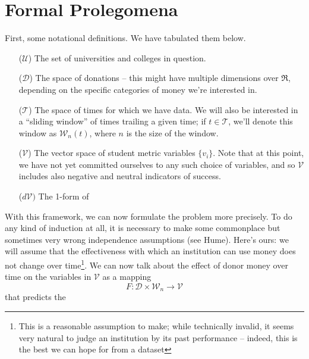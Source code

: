 \documentclass[paper.tex]{subfiles}
\newcommand{\U}{\mathcal{U}}
\newcommand{\D}{\mathcal{D}}
\newcommand{\V}{\mathcal{V}}
\newcommand{\T}{\mathcal{T}}
\newcommand{\W}{\mathcal{W}}
\begin{document}
	
	\section{Formal Prolegomena}
	
	First, some notational definitions. We have tabulated them below. 
	
	\begin{itemize}
		\item[($\U$)] The set of universities and colleges in question.
		\item[($\D$)] The space of donations -- this might have multiple dimensions over $\Re$, depending on the specific categories of money we're interested in. 
		\item[($\T$)] The space of times for which we have data. We will also be interested in a ``sliding window'' of times trailing a given time; if $t \in \T$, we'll denote this window as $\W_n(t)$, where $n$ is the size of the window.
		
		\item[($\V$)] The vector space of student metric variables $\{v_i\}$. Note that at this point, we have not yet committed ourselves to any such choice of variables, and so $\V$ includes also negative and neutral indicators of success.
		
		\item[($d\V)$] The 1-form of 
	\end{itemize}
	
	With this framework, we can now formulate the problem more precisely. To do any kind of induction at all, it is necessary to make some commonplace but sometimes very wrong independence assumptions (see Hume). Here's ours: we will assume that the effectiveness with which an institution can use money does not change over time\footnote{This is a reasonable assumption to make; while technically invalid, it seems very natural to judge an institution by its past performance -- indeed, this is the best we can hope for from a dataset}. We can now talk about the effect of donor money over time on the variables in $\V$ as a mapping
	\begin{equation}
	F: \D \times \W_n \to \V
	\end{equation} 	
	that predicts the 
\end{document}
